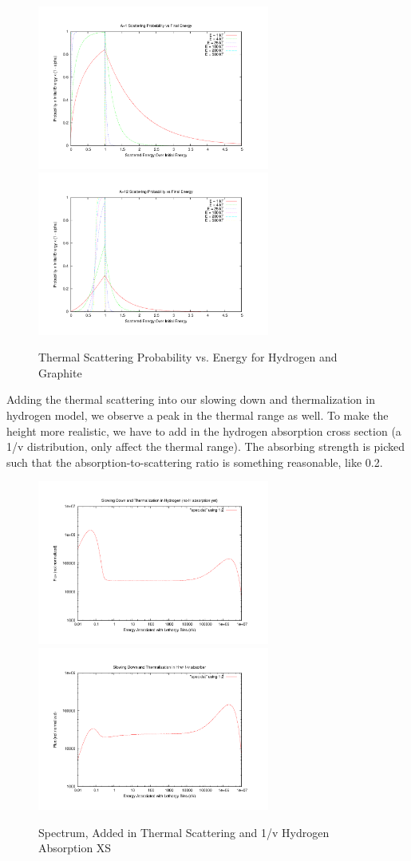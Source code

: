 \documentclass{school-22.211-notes}
\begin{document}
\begin{figure}[ht]
  \centering
  \includegraphics[width=3in]{images/sl-d/ts_H.uncrop.pdf}
  \includegraphics[width=3in]{images/sl-d/ts_C.uncrop.pdf}
  \caption{Thermal Scattering Probability vs. Energy for Hydrogen and Graphite} \label{ts-C-H}
\end{figure}

Adding the thermal scattering into our slowing down and thermalization in hydrogen model, we observe a peak in the thermal range as well. To make the height more realistic, we have to add in the hydrogen absorption cross section (a 1/v distribution, only affect the thermal range). The absorbing strength is picked such that the absorption-to-scattering ratio is something reasonable, like 0.2. 
\begin{figure}[ht]
  \centering
  \includegraphics[width=3in]{images/sl-d/spec-4.uncrop.pdf}
  \includegraphics[width=3in]{images/sl-d/spec-5.uncrop.pdf}
  \caption{Spectrum, Added in Thermal Scattering and 1/v Hydrogen Absorption XS} \label{spe1}
\end{figure}
\end{document}
